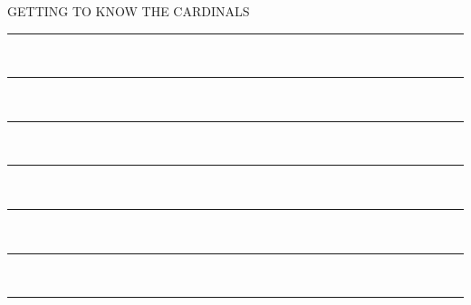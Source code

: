 \documentclass{article}
\theoremstyle{definition}
\theoremstyle{remark}
\begin{document}
\begin{titlepage}
	
	\vspace{\baselineskip} %
	
	{\LARGE GETTING TO KNOW THE CARDINALS\\} %
	
	\vspace{0.75\baselineskip} %
	
	
	

	\rule{7cm}{0.4pt} \\ \vspace*{-\baselineskip}\vspace*{4.2pt}
	\rule{8cm}{0.6pt} \\ \vspace*{-\baselineskip}\vspace*{4.4pt}
	\rule{9cm}{0.8pt} \\ \vspace*{-\baselineskip}\vspace*{4.6pt}
	\rule{10cm}{1.0pt} \\ \vspace*{-\baselineskip}\vspace*{4.8pt}
	\rule{11cm}{1.2pt} \\ \vspace*{-\baselineskip}\vspace*{5.0pt}
	\rule{12cm}{1.4pt} \\ \vspace*{-\baselineskip}\vspace*{5.2pt}
	\rule{\textwidth}{1.6pt} %
	

\end{titlepage}
\end{document}
